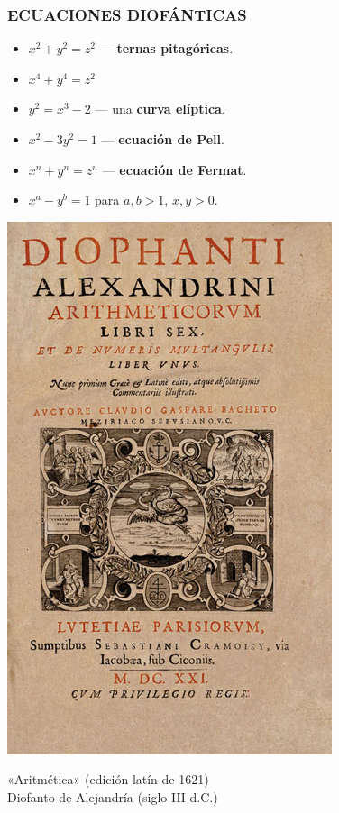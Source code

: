 \begin{frame}
  \frametitle{ECUACIONES DIOFÁNTICAS}


    \begin{itemize}
    \item<3-> $x^2 + y^2 = z^2$ --- \textbf{ternas pitagóricas}.


    \item<5-> $x^4 + y^4 = z^2$

    \item<7-> $y^2 = x^3 - 2$ --- una \textbf{curva elíptica}.

    \item<9-> $x^2 - 3 y^2 = 1$ --- \textbf{ecuación de Pell}.


    \item<11-> $x^n + y^n = z^n$ --- \textbf{ecuación de Fermat}.


    \item<13-> $x^a - y^b = 1$ para $a,b > 1$, $x,y > 0$.

    \end{itemize}
\end{frame}

\begin{frame}
  \begin{center}
    \includegraphics[width=.4\textwidth]{diofanto-aritmetica.jpg}

    «Aritmética» (edición latín de 1621) \\
    Diofanto de Alejandría (siglo III d.C.)
  \end{center}
\end{frame}

